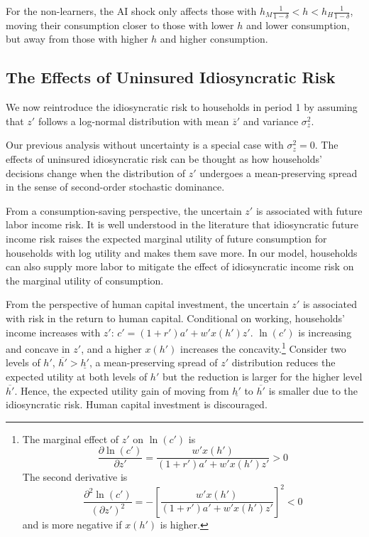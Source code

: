 \documentclass[12pt]{article}
\begin{document}
For the non-learners, the AI shock only affects those with $h_M\frac{1}{1-\delta}<h<h_H\frac{1}{1-\delta}$, moving their consumption closer to those with lower $h$ and lower consumption, but away from those with higher $h$ and higher consumption. 

\subsection{The Effects of Uninsured Idiosyncratic Risk}
We now reintroduce the idiosyncratic risk to households in period 1 by assuming that $z'$ follows a log-normal distribution with mean $\overline{z}'$ and variance $\sigma^2_z$. 

Our previous analysis without uncertainty is a special case with $\sigma^2_z=0$. The effects of uninsured idiosyncratic risk can be thought as how households' decisions change when the distribution of $z'$ undergoes a mean-preserving spread in the sense of second-order stochastic dominance.

From a consumption-saving perspective, the uncertain $z'$ is associated with future labor income risk. It is well understood in the literature that idiosyncratic future income risk raises the expected marginal utility of future consumption for households with log utility and makes them save more. In our model, households can also supply more labor to mitigate the effect of idiosyncratic income risk on the marginal utility of consumption. 

From the perspective of human capital investment, the uncertain $z'$ is associated with risk in the return to human capital. Conditional on working, households' income increases with $z'$: $c'=(1+r')a'+w'x(h')z'$. $\ln(c')$ is increasing and concave in $z'$, and a higher $x(h')$ increases the concavity.\footnote{The marginal effect of $z'$ on $\ln(c')$ is 
\begin{equation*}
    \frac{\partial\ln(c')}{\partial z'}=\frac{w'x(h')}{(1+r')a'+w'x(h')z'} > 0
\end{equation*}
The second derivative is 
\begin{equation*}
    \frac{\partial^2\ln(c')}{(\partial z')^2}=-\left[\frac{w'x(h')}{(1+r')a'+w'x(h')z'}\right]^2 <0
\end{equation*}
and is more negative if $x(h')$ is higher.} Consider two levels of $h'$, $\overline{h'}>\underline{h'}$, a mean-preserving spread of $z'$ distribution reduces the expected utility at both levels of $h'$ but the reduction is larger for the higher level $\overline{h'}$. Hence, the expected utility gain of moving from $\underline{h'}$ to $\overline{h'}$ is smaller due to the idiosyncratic risk. Human capital investment is discouraged.
\end{document}
